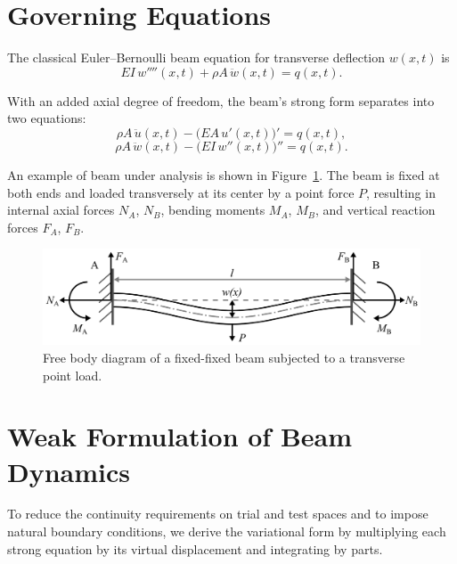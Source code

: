 \documentclass{article}
\begin{document}
	\section{Governing Equations}
	The classical Euler–Bernoulli beam equation for transverse deflection \(w(x,t)\) is
	\begin{equation}\label{eq:transverse_classical}
		EI\,w''''(x,t)
		+\rho A\,\ddot w(x,t)
		= q(x,t).
	\end{equation}
	
	With an added axial degree of freedom, the beam’s strong form separates into two equations:
	\begin{equation}\label{eq:axial_strong}
		\rho A\,\ddot u(x,t)
		- \bigl(EA\,u'(x,t)\bigr)'
		= q(x,t),
	\end{equation}
	\begin{equation}\label{eq:transverse_strong}
		\rho A\,\ddot w(x,t)
		- \bigl(EI\,w''(x,t)\bigr)''
		= q(x,t).
	\end{equation}
	
	An example of beam under analysis is shown in Figure~\ref{fig:FFB}. The beam is fixed at both ends and loaded transversely at its center by a point force \(P\), resulting in internal axial forces \(N_A\), \(N_B\), bending moments \(M_A\), \(M_B\), and vertical reaction forces \(F_A\), \(F_B\).
	\begin{figure}[H]
		\centering
		\includegraphics[width=4.7in]{Figures/FFB_Figure.png}
		\caption[FFB]{\label{fig:FFB} 
			Free body diagram of a fixed-fixed beam subjected to a transverse point load.}
	\end{figure} 
	
	
	\section{Weak Formulation of Beam Dynamics}
	To reduce the continuity requirements on trial and test spaces and to impose natural boundary conditions, we derive the variational form by multiplying each strong equation by its virtual displacement and integrating by parts.
	
\end{document}

